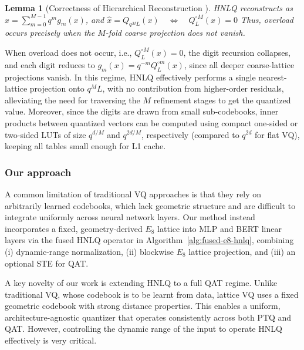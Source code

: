 \documentclass{article}
\newtheorem{lemma}{Lemma}
\theoremstyle{definition}
\theoremstyle{remark}
\begin{document}
\begin{lemma}[Correctness of Hierarchical Reconstruction \cite{hnlq}]
HNLQ reconstructs as $\hat{x}=\sum_{m=0}^{M-1} q^m g_m(x)$, and
$\hat{x}=Q_{q^M L}(x) \quad \Longleftrightarrow \quad Q_L^{\circ M}(x)=0$
Thus, overload occurs precisely when the $M$-fold coarse projection does not vanish.
\end{lemma}

When overload does not occur, i.e., $Q_L^{\circ M}(x)=0$, the digit recursion collapses, and each digit reduces to $g_m(x)=q^{-m} Q_L^{\circ m}(x)$, 
since all deeper coarse-lattice projections vanish. In this regime, HNLQ effectively performs a single nearest-lattice projection onto $q^M L$, with no contribution from higher-order residuals, alleviating the need for traversing the $M$ refinement stages to get the quantized value. Moreover, since the digits are drawn from small sub-codebooks, inner products between quantized vectors can be computed using compact one-sided or two-sided LUTs of size $q^{d/M}$ and $q^{2d/M}$, respectively (compared to $q^{2d}$ for flat VQ), keeping all tables small enough for L1 cache.

\subsubsection{Our approach}\label{E8approach}
\vspace{-1cm}
A common limitation of traditional VQ approaches is that they rely on arbitrarily learned codebooks, which lack geometric structure and are difficult to integrate uniformly across neural network layers. Our method instead incorporates a fixed, geometry-derived $E_8$ lattice into MLP and BERT linear layers via the fused HNLQ operator in Algorithm~\ref{alg:fused-e8-hnlq}, combining (i) dynamic-range normalization, (ii) blockwise $E_8$ lattice projection, and (iii) an optional STE for QAT.

A key novelty of our work is extending HNLQ to a full QAT regime. Unlike traditional VQ, whose codebook is to be learnt from data, lattice VQ uses a fixed geometric codebook with strong distance properties. This enables a uniform, architecture-agnostic quantizer that operates consistently across both PTQ and QAT. However, controlling the dynamic range of the input to operate HNLQ effectively is very critical.

\end{document}
